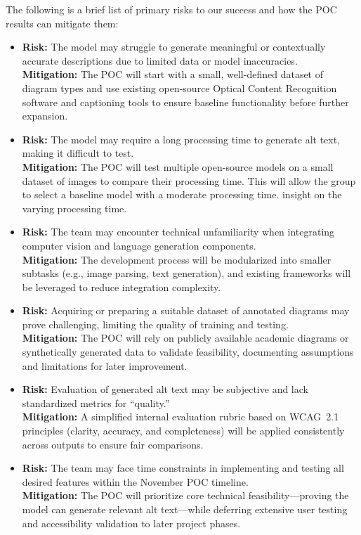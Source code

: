 \documentclass{article}
\begin{document}
The following is a brief list of primary risks to our success and how the POC results can mitigate them: 
\begin{itemize}
  \item \textbf{Risk:} The model may struggle to generate meaningful or contextually accurate descriptions due to limited data or model inaccuracies.\\
  \textbf{Mitigation:} The POC will start with a small, well-defined dataset of diagram types and use existing open-source Optical Content Recognition software and captioning tools to ensure baseline functionality before further expansion.
  
  \item \textbf{Risk:} The model may require a long processing time to generate alt text, making it difficult to test. \\
  \textbf{Mitigation:} The POC will test multiple open-source models on a small dataset of images to compare their processing time. This will allow the group to select a baseline model with a moderate processing time.  insight on the varying processing time. 

  \item \textbf{Risk:} The team may encounter technical unfamiliarity when integrating computer vision and language generation components.\\
  \textbf{Mitigation:} The development process will be modularized into smaller subtasks (e.g., image parsing, text generation), and existing frameworks will be leveraged to reduce integration complexity.

  \item \textbf{Risk:} Acquiring or preparing a suitable dataset of annotated diagrams may prove challenging, limiting the quality of training and testing.\\
  \textbf{Mitigation:} The POC will rely on publicly available academic diagrams or synthetically generated data to validate feasibility, documenting assumptions and limitations for later improvement.

  \item \textbf{Risk:} Evaluation of generated alt text may be subjective and lack standardized metrics for “quality.”\\
  \textbf{Mitigation:} A simplified internal evaluation rubric based on WCAG~2.1 principles (clarity, accuracy, and completeness) will be applied consistently across outputs to ensure fair comparisons.

  \item \textbf{Risk:} The team may face time constraints in implementing and testing all desired features within the November POC timeline.\\
  \textbf{Mitigation:} The POC will prioritize core technical feasibility—proving the model can generate relevant alt text—while deferring extensive user testing and accessibility validation to later project phases.


\end{itemize}
\end{document}
